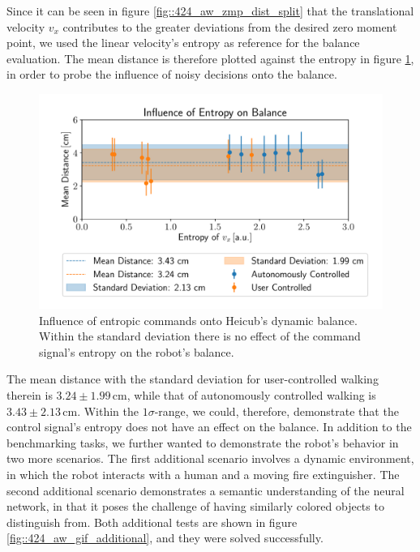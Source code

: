 Since it can be seen in figure \ref{fig::424_aw_zmp_dist_split} that the translational velocity $v_x$ contributes to the greater deviations from the desired zero moment point, we used the linear velocity's entropy as reference for the balance evaluation. The mean distance is therefore plotted against the entropy in figure \ref{fig::424_entropy_balance}, in order to probe the influence of noisy decisions onto the balance.
\begin{figure}[h!]
	\centering
	\includegraphics[scale=.5]{chapters/04_experiments/02_autonomous_walking/entropy_against_balance.pdf}
	\caption{Influence of entropic commands onto Heicub's dynamic balance. Within the standard deviation there is no effect of the command signal's entropy on the robot's balance.}
	\label{fig::424_entropy_balance}
\end{figure}
The mean distance with the standard deviation for user-controlled walking therein is $3.24\pm1.99\,\text{cm}$, while that of autonomously controlled walking is $3.43\pm2.13\,\text{cm}$. Within the $1\sigma$-range, we could, therefore, demonstrate that the control signal's entropy does not have an effect on the balance. In addition to the benchmarking tasks, we further wanted to demonstrate the robot's behavior in two more scenarios. The first additional scenario involves a dynamic environment, in which the robot interacts with a human and a moving fire extinguisher. The second additional scenario demonstrates a semantic understanding of the neural network, in that it poses the challenge of having similarly colored objects to distinguish from. Both additional tests are shown in figure \ref{fig::424_aw_gif_additional}, and they were solved successfully.
